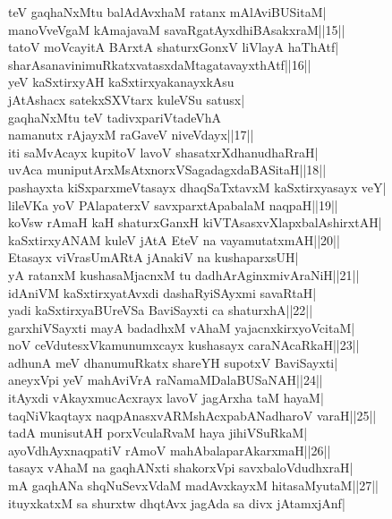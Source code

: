 \documentclass{article}
\begin{document}
teV gaqhaNxMtu balAdAvxhaM ratanx mAlAviBUSitaM|\\
manoVveVgaM kAmajavaM savaRgatAyxdhiBAsakxraM||15||\\
tatoV moVcayitA BArxtA shaturxGonxV liVlayA haThAtf|\\
sharAsanavinimuRkatxvatasxdaMtagatavayxthAtf||16||\\
yeV kaSxtirxyAH kaSxtirxyakanayxkAsu\\
jAtAshacx satekxSXVtarx kuleVSu satusx|\\
gaqhaNxMtu teV tadivxpariVtadeVhA\\
namanutx rAjayxM raGaveV niveVdayx||17||\\
iti saMvAcayx kupitoV lavoV shasatxrXdhanudhaRraH|\\
uvAca muniputArxMsAtxnorxVSagadagxdaBASitaH||18||\\
pashayxta kiSxparxmeVtasayx dhaqSaTxtavxM kaSxtirxyasayx veY|\\
lileVKa yoV PAlapaterxV savxparxtApabalaM naqpaH||19||\\
koVsw rAmaH kaH shaturxGanxH kiVTAsasxvXlapxbalAshirxtAH|\\
kaSxtirxyANAM kuleV jAtA EteV na vayamutatxmAH||20||\\
Etasayx viVrasUmARtA jAnakiV na kushaparxsUH|\\
yA ratanxM kushasaMjacnxM tu dadhArAginxmivAraNiH||21||\\
idAniVM kaSxtirxyatAvxdi dashaRyiSAyxmi savaRtaH|\\
yadi kaSxtirxyaBUreVSa BaviSayxti ca shaturxhA||22||\\
garxhiVSayxti mayA badadhxM vAhaM yajacnxkirxyoVcitaM|\\
noV ceVdutesxVkamunumxcayx kushasayx caraNAcaRkaH||23||\\
adhunA meV dhanumuRkatx shareYH supotxV BaviSayxti|\\
aneyxVpi yeV mahAviVrA raNamaMDalaBUSaNAH||24||\\
itAyxdi vAkayxmucAcxrayx lavoV jagArxha taM hayaM|\\
taqNiVkaqtayx naqpAnasxvARMshAcxpabANadharoV varaH||25||\\
tadA munisutAH porxVculaRvaM haya jihiVSuRkaM|\\
ayoVdhAyxnaqpatiV rAmoV mahAbalaparAkarxmaH||26||\\
tasayx vAhaM na gaqhANxti shakorxVpi savxbaloVdudhxraH|\\
mA gaqhANa shqNuSevxVdaM madAvxkayxM hitasaMyutaM||27||\\
ituyxkatxM sa shurxtw dhqtAvx jagAda sa divx jAtamxjAnf|\\
\end{document}
